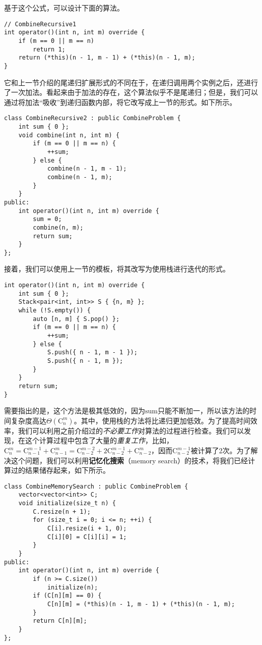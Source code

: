 基于这个公式，可以设计下面的算法。

\begin{lstlisting}
// CombineRecursive1
int operator()(int n, int m) override {
    if (m == 0 || m == n)
        return 1;
    return (*this)(n - 1, m - 1) + (*this)(n - 1, m);
}
\end{lstlisting}

它和上一节介绍的尾递归扩展形式的不同在于，在递归调用两个实例之后，还进行了一次加法。看起来由于加法的存在，这个算法似乎不是尾递归；但是，我们可以通过将加法“吸收”到递归函数内部，将它改写成上一节的形式。如下所示。

\begin{lstlisting}
class CombineRecursive2 : public CombineProblem {
    int sum { 0 };
    void combine(int n, int m) {
        if (m == 0 || m == n) {
            ++sum;
        } else {
            combine(n - 1, m - 1);
            combine(n - 1, m);
        }
    }
public:
    int operator()(int n, int m) override {
        sum = 0;
        combine(n, m);
        return sum;
    }
};
\end{lstlisting}

接着，我们可以使用上一节的模板，将其改写为使用栈进行迭代的形式。

\begin{lstlisting}
int operator()(int n, int m) override {
    int sum { 0 };
    Stack<pair<int, int>> S { {n, m} };
    while (!S.empty()) {
        auto [n, m] { S.pop() };
        if (m == 0 || m == n) {
            ++sum;
        } else {
            S.push({ n - 1, m - 1 });
            S.push({ n - 1, m });
        }
    }
    return sum;
}
\end{lstlisting}

需要指出的是，这个方法是极其低效的，因为$\mathrm{sum}$只能不断加一，所以该方法的时间复杂度高达$\Theta\left(\mathrm{C}_n^m\right)$。其中，使用栈的方法将比递归更加低效。为了提高时间效率，我们可以利用之前介绍过的\textit{不必要工作}对算法的过程进行检查。我们可以发现，在这个计算过程中包含了大量的\textit{重复工作}，比如，$\mathrm{C}_n^m=\mathrm{C}_{n-1}^{m-1}+\mathrm{C}_{n-1}^m=\mathrm{C}_{n-2}^{m-2}+2\mathrm{C}_{n-2}^{m-1}+\mathrm{C}_{n-2}^m$，因而$\mathrm{C}_{n-2}^{m-1}$被计算了2次。为了解决这个问题，我们可以利用\textbf{记忆化搜索}（memory search）的技术，将我们已经计算过的结果储存起来，如下所示。

\begin{lstlisting}
class CombineMemorySearch : public CombineProblem {
    vector<vector<int>> C;
    void initialize(size_t n) {
        C.resize(n + 1);
        for (size_t i = 0; i <= n; ++i) {
            C[i].resize(i + 1, 0);
            C[i][0] = C[i][i] = 1;
        }
    }
public:
    int operator()(int n, int m) override {
        if (n >= C.size())
            initialize(n);
        if (C[n][m] == 0) {
            C[n][m] = (*this)(n - 1, m - 1) + (*this)(n - 1, m);
        }
        return C[n][m];
    }
};
\end{lstlisting}


